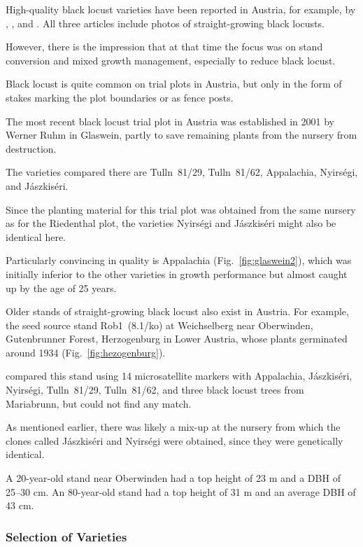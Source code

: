 High-quality black locust varieties have been reported in Austria, for example, by \citet{mueller1991robinie},
\citet{iby1998robinie}, and \citet{demel2004robinie}. All three articles include photos of straight-growing black locusts.

However, there is the impression that at that time the focus was on stand conversion and mixed growth management,
especially to reduce black locust.

Black locust is quite common on trial plots in Austria, but only in the form of stakes marking the plot boundaries or as fence posts.

The most recent black locust trial plot in Austria was established in 2001 by Werner Ruhm in Glaswein,
partly to save remaining plants from the nursery from destruction.

The varieties compared there are Tulln~81/29, Tulln~81/62, Appalachia, Nyirségi, and Jászkiséri.

Since the planting material for this trial plot was obtained from the same nursery as for the Riedenthal plot,
the varieties Nyirségi and Jászkiséri might also be identical here.

Particularly convincing in quality is Appalachia (Fig.~\ref{fig:glaswein2}), which was initially inferior
to the other varieties in growth performance but almost caught up by the age of 25 years.


Older stands of straight-growing black locust also exist in Austria.
For example, the seed source stand Rob1~(8.1/ko) at Weichselberg near Oberwinden,
Gutenbrunner Forest, Herzogenburg in Lower Austria, whose plants germinated
around 1934 (Fig.~\ref{fig:hezogenburg}).

\citet{heinze2014robinie} compared this stand using 14 microsatellite markers
with Appalachia, Jászkiséri, Nyirségi, Tulln~81/29, Tulln~81/62, and three
black locust trees from Mariabrunn, but could not find any match.

As mentioned earlier, there was likely a mix-up at the nursery from which the clones
called Jászkiséri and Nyirségi were obtained, since they were genetically identical.

A 20-year-old stand near Oberwinden had a top height of 23 m and a DBH of 25–30 cm.
An 80-year-old stand had a top height of 31 m and an average DBH of 43 cm.


\subsubsection{Selection of Varieties}


